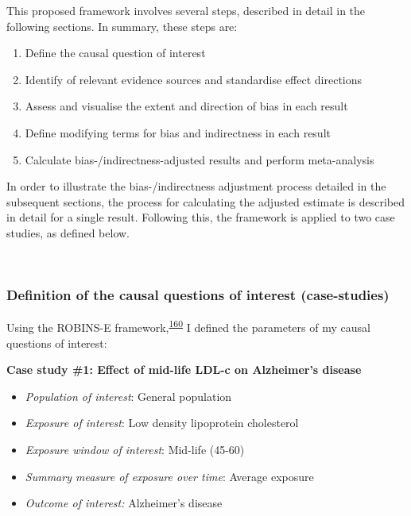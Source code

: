 \documentclass[a4paper, twoside]{templates/ociamthesis}
\providecommand{\tightlist}{%
  \setlength{\itemsep}{0pt}\setlength{\parskip}{0pt}}
\begin{document}
This proposed framework involves several steps, described in detail in the following sections. In summary, these steps are:

\begin{enumerate}
\def\labelenumi{\arabic{enumi}.}
\tightlist
\item
  Define the causal question of interest
\item
  Identify of relevant evidence sources and standardise effect directions
\item
  Assess and visualise the extent and direction of bias in each result
\item
  Define modifying terms for bias and indirectness in each result
\item
  Calculate bias-/indirectness-adjusted results and perform meta-analysis
\end{enumerate}

In order to illustrate the bias-/indirectness adjustment process detailed in the subsequent sections, the process for calculating the adjusted estimate is described in detail for a single result. Following this, the framework is applied to two case studies, as defined below.

~

\hypertarget{definition-of-the-causal-questions-of-interest-case-studies}{%
\subsubsection{Definition of the causal questions of interest (case-studies)}\label{definition-of-the-causal-questions-of-interest-case-studies}}

Using the ROBINS-E framework,\textsuperscript{\protect\hyperlink{ref-morganr2020}{160}} I defined the parameters of my causal questions of interest:

\textbf{Case study \#1: Effect of mid-life LDL-c on Alzheimer's disease}

\begin{itemize}
\tightlist
\item
  \emph{Population of interest}: General population
\item
  \emph{Exposure of interest}: Low density lipoprotein cholesterol
\item
  \emph{Exposure window of interest}: Mid-life (45-60)
\item
  \emph{Summary measure of exposure over time}: Average exposure
\item
  \emph{Outcome of interest:} Alzheimer's disease
\end{itemize}
\end{document}
